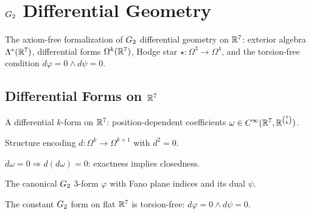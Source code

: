 
\chapter{$G_2$ Differential Geometry}\label{chap:geometry}

The axiom-free formalization of $G_2$ differential geometry on $\mathbb{R}^7$:
exterior algebra $\Lambda^*(\mathbb{R}^7)$, differential forms $\Omega^k(\mathbb{R}^7)$,
Hodge star $\star : \Omega^3 \to \Omega^4$, and the torsion-free condition
$d\varphi = 0 \wedge d\psi = 0$.

\section{Differential Forms on $\mathbb{R}^7$}

\begin{definition}\label{def:diffform}
    \leanok
    A differential $k$-form on $\mathbb{R}^7$: position-dependent coefficients
    $\omega \in C^\infty(\mathbb{R}^7, \mathbb{R}^{\binom{7}{k}})$.
\end{definition}

\begin{definition}\label{def:ext_deriv}
    \leanok
    Structure encoding $d : \Omega^k \to \Omega^{k+1}$ with $d^2 = 0$.
\end{definition}

\begin{theorem}\label{thm:exact_closed}
    \leanok
    $d\omega = 0 \Rightarrow d(d\omega) = 0$: exactness implies closedness.
\end{theorem}

\begin{definition}\label{def:standardG2}
    \leanok
    The canonical $G_2$ 3-form $\varphi$ with Fano plane indices and its dual $\psi$.
\end{definition}

\begin{theorem}\label{thm:standardG2_tf}
    \leanok
    The constant $G_2$ form on flat $\mathbb{R}^7$ is torsion-free: $d\varphi = 0 \wedge d\psi = 0$.
\end{theorem}

